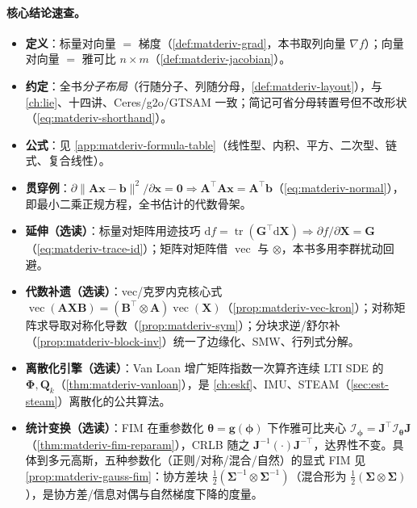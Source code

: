 \paragraph{核心结论速查。}
\begin{itemize}
  \item \textbf{定义}：标量对向量 $=$ 梯度（\cref{def:matderiv-grad}，本书取列向量 $\nabla f$）；向量对向量 $=$ 雅可比 $n\times m$（\cref{def:matderiv-jacobian}）。
  \item \textbf{约定}：全书\emph{分子布局}（行随分子、列随分母，\cref{def:matderiv-layout}），与 \cref{ch:lie}、十四讲、Ceres/g2o/GTSAM 一致；简记可省分母转置号但不改形状（\cref{eq:matderiv-shorthand}）。
  \item \textbf{公式}：见 \cref{app:matderiv-formula-table}（线性型、内积、平方、二次型、链式、复合线性）。
  \item \textbf{贯穿例}：$\partial\|\mathbf{A}\mathbf{x}-\mathbf{b}\|^2/\partial\mathbf{x}=\mathbf{0}\Rightarrow\mathbf{A}^\top\mathbf{A}\mathbf{x}=\mathbf{A}^\top\mathbf{b}$（\cref{eq:matderiv-normal}），即最小二乘正规方程，全书估计的代数骨架。
  \item \textbf{延伸（选读）}：标量对矩阵用迹技巧 $\mathrm{d}f=\operatorname{tr}(\mathbf{G}^\top\mathrm{d}\mathbf{X})\Rightarrow\partial f/\partial\mathbf{X}=\mathbf{G}$（\cref{eq:matderiv-trace-id}）；矩阵对矩阵借 $\operatorname{vec}$ 与 $\otimes$，本书多用李群扰动回避。
  \item \textbf{代数补遗（选读）}：vec/克罗内克核心式 $\operatorname{vec}(\mathbf{A}\mathbf{X}\mathbf{B})=(\mathbf{B}^\top\otimes\mathbf{A})\operatorname{vec}(\mathbf{X})$（\cref{prop:matderiv-vec-kron}）；对称矩阵求导取对称化导数（\cref{prop:matderiv-sym}）；分块求逆/舒尔补（\cref{prop:matderiv-block-inv}）统一了边缘化、SMW、行列式分解。
  \item \textbf{离散化引擎（选读）}：Van Loan 增广矩阵指数一次算齐连续 LTI SDE 的 $\boldsymbol{\Phi},\mathbf{Q}_k$（\cref{thm:matderiv-vanloan}），是 \cref{ch:eskf}、IMU、STEAM（\cref{sec:est-steam}）离散化的公共算法。
  \item \textbf{统计变换（选读）}：FIM 在重参数化 $\boldsymbol{\theta}=\mathbf{g}(\boldsymbol{\phi})$ 下作雅可比夹心 $\boldsymbol{\mathcal{I}}_{\boldsymbol{\phi}}=\mathbf{J}^\top\boldsymbol{\mathcal{I}}_{\boldsymbol{\theta}}\mathbf{J}$（\cref{thm:matderiv-fim-reparam}），CRLB 随之 $\mathbf{J}^{-1}(\cdot)\mathbf{J}^{-\top}$，达界性不变。具体到多元高斯，五种参数化（正则/对称/混合/自然）的显式 FIM 见 \cref{prop:matderiv-gauss-fim}：协方差块 $\tfrac12(\boldsymbol{\Sigma}^{-1}\otimes\boldsymbol{\Sigma}^{-1})$（混合形为 $\tfrac12(\boldsymbol{\Sigma}\otimes\boldsymbol{\Sigma})$），是协方差/信息对偶与自然梯度下降的度量。
\end{itemize}

